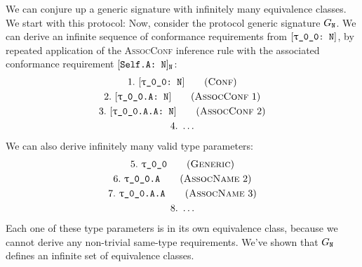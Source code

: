 \documentclass[../generics]{subfiles}
\begin{document}
\begin{example}\label{protocol n example}
We can conjure up a generic signature with infinitely many equivalence classes. We start with this protocol:
Now, consider the protocol generic signature $G_{\texttt{N}}$. We can derive an infinite sequence of conformance requirements from $\ConfReq{\rT}{N}$, by repeated application of the \textsc{AssocConf} inference rule with the associated conformance requirement $[\texttt{Self.A:~N}]_{\texttt{N}}$:
\begin{gather*}
\ConfStep{\rT}{N}{1}\\
\AssocConfStep{1}{\rT.A}{N}{2}\\
\AssocConfStep{2}{\rT.A.A}{N}{3}\\
4.\ \ldots
\end{gather*}
We can also derive infinitely many valid type parameters:
\begin{gather*}
\GenericStep{\rT}{5}\\
\AssocNameStep{2}{\rT.A}{6}\\
\AssocNameStep{3}{\rT.A.A}{7}\\
8.\ \ldots
\end{gather*}
Each one of these type parameters is in its own equivalence class, because we cannot derive any non-trivial same-type requirements. We've shown that $G_{\texttt{N}}$ defines an infinite set of equivalence classes.
\end{example}
\end{document}
